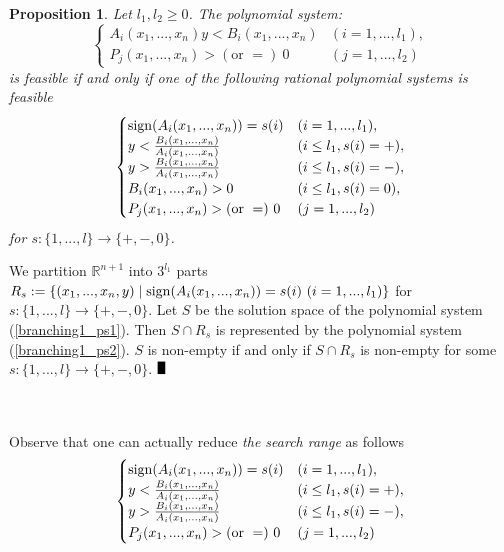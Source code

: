 \documentclass{article}
\def\BBox{\rule{2mm}{3mm}}
\def\QED{\hfill$\BBox$}
\newenvironment{proof}
{\begin{rm}\par\smallskip\noindent{\bf Proof.}\quad}{\QED\end{rm}}
\newtheorem{prop}[thm]{\bfseries Proposition} %
\begin{document}
\begin{prop}\label{branching1}
Let $l_1,l_2 \geq 0$.
The polynomial system:
\begin{equation}\label{branching1_ps1}
\begin{cases}
 A_{i}(x_{1},...,x_{n})y < B_{i}(x_{1},...,x_{n}) & (i=1,...,l_1), \\
 P_j(x_1,...,x_n) > (\text{or }=)  \ 0 & (j=1,...,l_2)
 \end{cases}
 \end{equation}
is feasible if and only if one of the following rational polynomial systems is feasible
\begin{equation} \label{branching1_ps2}
 \begin{cases}
{\rm sign}(A_{i}(x_{1},...,x_{n})) = s(i) & (i=1,...,l_1), \\
y < \frac{B_{i}(x_{1},...,x_{n})}{A_{i}(x_{1},...,x_{n})} & (i \leq l_1,s(i)=+),\\
y > \frac{B_{i}(x_{1},...,x_{n})}{A_{i}(x_{1},...,x_{n})} & (i \leq l_1,s(i)=-),\\
B_i(x_1,...,x_n) > 0 & (i \leq l_1,s(i)=0),\\
P_j(x_1,...,x_n) > (\text{or }=)  \ 0 & (j=1,...,l_2)
\end{cases} 
\end{equation}
for $s:\{ 1,...,l\} \rightarrow \{ +,-,0\}$.
\end{prop}
\begin{proof}
We partition $\mathbb{R}^{n+1}$ into $3^{l_1}$ parts $R_s:=\{ (x_1,...,x_n,y) \mid {\rm sign}(A_{i}(x_{1},...,x_{n})) = s(i) \ (i=1,...,l_1) \}$
for $s:\{ 1,...,l\} \rightarrow \{ +,-,0\}$.
Let $S$ be the solution space of the polynomial system (\ref{branching1_ps1}).
Then $S \cap R_s$ is represented by the polynomial system (\ref{branching1_ps2}).
$S$ is non-empty if and only if $S \cap R_s$ is non-empty for some $s:\{ 1,...,l\} \rightarrow \{ +,-,0\}$.
\end{proof}
\\
\\
Observe that one can actually reduce {\it the search range} as follows
\begin{equation} \label{branching1_ps3}
\begin{cases}
{\rm sign}(A_{i}(x_{1},...,x_{n})) = s(i) & (i=1,...,l_1), \\
y < \frac{B_{i}(x_{1},...,x_{n})}{A_{i}(x_{1},...,x_{n})} & (i \leq l_1,s(i)=+),\\
y > \frac{B_{i}(x_{1},...,x_{n})}{A_{i}(x_{1},...,x_{n})} & (i \leq l_1,s(i)=-),\\
P_j(x_1,...,x_n) > (\text{or }=)  \ 0 & (j=1,...,l_2)
\end{cases} 
\end{equation}
\end{document}

